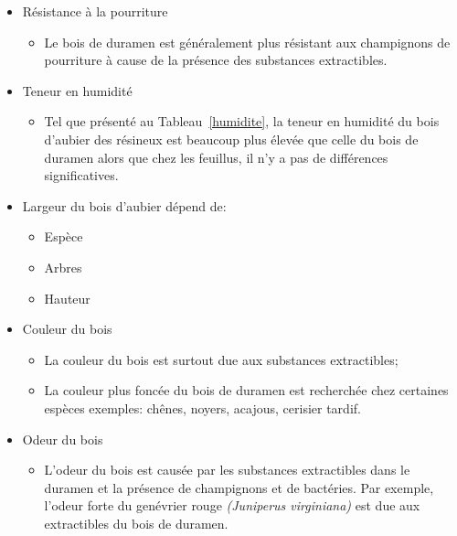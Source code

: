 \begin{itemize}
\item Résistance à la pourriture
	\begin{itemize}
	\item Le bois de duramen est généralement plus résistant aux champignons de pourriture à cause de la présence des substances extractibles. 
	\end{itemize} 
 
\item Teneur en humidité
	\begin{itemize}
	\item Tel que présenté au Tableau~\ref{humidite}, la teneur en humidité du bois d'aubier des résineux est beaucoup plus élevée que celle du bois de duramen alors que chez les feuillus, il n'y a pas de différences significatives.
	\end{itemize} 
	
\item Largeur du bois d'aubier dépend de:
	\begin{itemize} 
	\item Espèce 
	\item Arbres 
	\item Hauteur 
	\end{itemize}
% 
\item Couleur du bois
	\begin{itemize}
	\item La couleur du bois est surtout due aux substances extractibles; 
	\item La couleur plus foncée du bois de duramen est recherchée chez certaines espèces exemples: chênes, noyers, acajous, cerisier tardif. 
	\end{itemize}
\item Odeur du bois
	\begin{itemize}
	\item L'odeur du bois est causée par les substances extractibles dans le duramen et la présence de champignons et de bactéries. Par exemple, l'odeur forte du genévrier rouge \textit{(Juniperus virginiana)} est due aux extractibles du bois de duramen.
	\end{itemize}

\end{itemize} 

